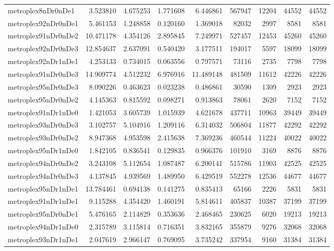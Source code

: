 \begin{longtable}{|l|r|r|r|r|r|r|r|r|}
metroplex8nDr0nDe1 & 3.523810 & 4.675253 & 1.771608 & 6.446861 & 567947 & 12204 & 44552 & 44552 \\
metroplex92nDr0nDe1 & 5.461153 & 1.248858 & 0.120160 & 1.369018 & 82032 & 2997 & 8581 & 8581 \\
metroplex91nDr0nDe2 & 10.471178 & 4.354126 & 2.895845 & 7.249971 & 527457 & 12453 & 45260 & 45260 \\
metroplex92nDr0nDe3 & 12.854637 & 2.637091 & 0.540420 & 3.177511 & 194017 & 5597 & 18099 & 18099 \\
metroplex92nDr1nDe1 & 4.253133 & 0.734015 & 0.063556 & 0.797571 & 73116 & 2735 & 7798 & 7798 \\
metroplex91nDr0nDe3 & 14.909774 & 4.512232 & 6.976916 & 11.489148 & 481509 & 11612 & 42226 & 42226 \\
metroplex95nDr0nDe3 & 8.090226 & 0.463623 & 0.023238 & 0.486861 & 30590 & 1309 & 2923 & 2923 \\
metroplex95nDr0nDe2 & 4.145363 & 0.815592 & 0.098271 & 0.913863 & 78061 & 2620 & 7152 & 7152 \\
metroplex91nDr1nDe0 & 1.421053 & 3.605739 & 1.015939 & 4.621678 & 437711 & 10963 & 39449 & 39449 \\
metroplex93nDr0nDe3 & 3.102757 & 5.104916 & 1.209116 & 6.314032 & 506804 & 11877 & 42292 & 42292 \\
metroplex93nDr0nDe2 & 8.947368 & 4.953598 & 2.415638 & 7.369236 & 460544 & 11224 & 40022 & 40022 \\
metroplex95nDr1nDe0 & 1.842105 & 0.836541 & 0.129835 & 0.966376 & 101910 & 3169 & 8876 & 8876 \\
metroplex94nDr0nDe2 & 3.243108 & 5.112654 & 1.087487 & 6.200141 & 515786 & 11903 & 42525 & 42525 \\
metroplex94nDr0nDe3 & 4.137845 & 4.939569 & 1.489950 & 6.429519 & 552278 & 12536 & 44677 & 44677 \\
metroplex95nDr1nDe1 & 13.784461 & 0.694138 & 0.141275 & 0.835413 & 65166 & 2226 & 5831 & 5831 \\
metroplex91nDr1nDe1 & 9.115288 & 4.354420 & 1.460191 & 5.814611 & 405837 & 10387 & 37199 & 37199 \\
metroplex95nDr0nDe1 & 5.476165 & 2.114829 & 0.353636 & 2.468465 & 230625 & 6020 & 19213 & 19213 \\
metroplex94nDr1nDe0 & 2.315789 & 3.115814 & 0.716351 & 3.832165 & 355879 & 9276 & 32068 & 32068 \\
metroplex93nDr1nDe1 & 2.047619 & 2.966147 & 0.769095 & 3.735242 & 337954 & 9160 & 31384 & 31384 \\

\end{longtable}
